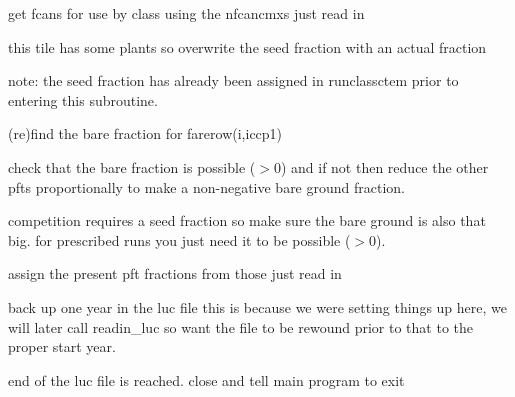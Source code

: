 get fcans for use by class using the nfcancmxs just read in

this tile has some plants so overwrite the seed fraction with an actual fraction

note\+: the seed fraction has already been assigned in runclassctem prior to entering this subroutine.

(re)find the bare fraction for farerow(i,iccp1)

check that the bare fraction is possible ($>$0) and if not then reduce the other pfts proportionally to make a non-\/negative bare ground fraction.

competition requires a \textquotesingle{}seed\textquotesingle{} fraction so make sure the bare ground is also that big. for prescribed runs you just need it to be possible ($>$0).

assign the present pft fractions from those just read in

back up one year in the luc file this is because we were setting things up here, we will later call readin\+\_\+luc so want the file to be rewound prior to that to the proper start year.

end of the luc file is reached. close and tell main program to exit 
